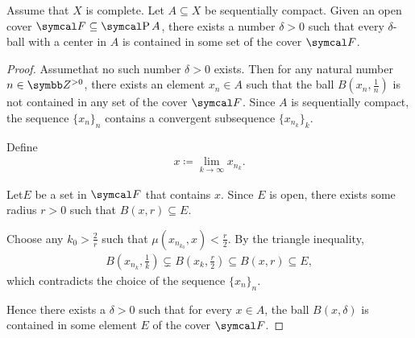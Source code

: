 \begin{lemma}\label{thm:lebesgue_covering_lemma}
  Assume that \( X \) is complete. Let \( A \subseteq X \) be sequentially compact. Given an open cover \( \Cal{F} \subseteq \Power A \), there exists a number \( \delta > 0 \) such that every \( \delta \)-ball with a center in \( A \) is contained in some set of the cover \( \Cal{F} \).
\end{lemma}
\begin{proof}
  Assume\LEM that no such number \( \delta > 0 \) exists. Then for any natural number \( n \in \BB{Z}^{>0} \), there exists an element \( x_n \in A \) such that the ball \( B(x_n, \frac 1 n) \) is not contained in any set of the cover \( \Cal{F} \). Since \( A \) is sequentially compact, the sequence \( \{ x_n \}_n \) contains a convergent subsequence \( \{ x_{n_k} \}_k \).

  Define
  \begin{align*}
    x \coloneqq \lim_{k \to \infty} x_{n_k}.
  \end{align*}

  Let\AOC \( E \) be a set in \( \Cal{F} \) that contains \( x \). Since \( E \) is open, there exists some radius \( r > 0 \) such that \( B(x, r) \subseteq E \).

  Choose any \( k_0 > \frac 2 r \) such that \( \mu(x_{n_{k_0}}, x) < \frac r 2 \). By the triangle inequality,
  \begin{align*}
    B \left(x_{n_k}, \frac 1 k \right) \subsetneq B \left(x_k, \frac r 2 \right) \subseteq B(x, r) \subseteq E,
  \end{align*}
  which contradicts the choice of the sequence \( \{ x_n \}_n \).

  Hence there exists a \( \delta > 0 \) such that for every \( x \in A \), the ball \( B(x, \delta) \) is contained in some element \( E \) of the cover \( \Cal{F} \).
\end{proof}

